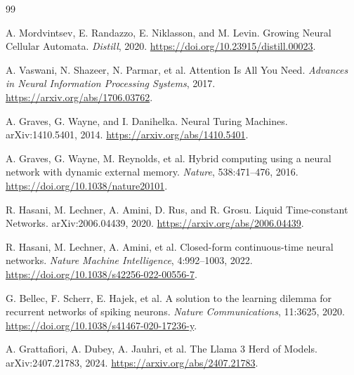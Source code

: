 \documentclass[11pt]{article}
\begin{document}
\begin{thebibliography}{99}

A. Mordvintsev, E. Randazzo, E. Niklasson, and M. Levin.
\newblock Growing Neural Cellular Automata.
\newblock \emph{Distill}, 2020.
\newblock \url{https://doi.org/10.23915/distill.00023}.

A. Vaswani, N. Shazeer, N. Parmar, et al.
\newblock Attention Is All You Need.
\newblock \emph{Advances in Neural Information Processing Systems}, 2017.
\newblock \url{https://arxiv.org/abs/1706.03762}.

A. Graves, G. Wayne, and I. Danihelka.
\newblock Neural Turing Machines.
\newblock arXiv:1410.5401, 2014.
\newblock \url{https://arxiv.org/abs/1410.5401}.

A. Graves, G. Wayne, M. Reynolds, et al.
\newblock Hybrid computing using a neural network with dynamic external memory.
\newblock \emph{Nature}, 538:471--476, 2016.
\newblock \url{https://doi.org/10.1038/nature20101}.

R. Hasani, M. Lechner, A. Amini, D. Rus, and R. Grosu.
\newblock Liquid Time-constant Networks.
\newblock arXiv:2006.04439, 2020.
\newblock \url{https://arxiv.org/abs/2006.04439}.

R. Hasani, M. Lechner, A. Amini, et al.
\newblock Closed-form continuous-time neural networks.
\newblock \emph{Nature Machine Intelligence}, 4:992--1003, 2022.
\newblock \url{https://doi.org/10.1038/s42256-022-00556-7}.

G. Bellec, F. Scherr, E. Hajek, et al.
\newblock A solution to the learning dilemma for recurrent networks of spiking neurons.
\newblock \emph{Nature Communications}, 11:3625, 2020.
\newblock \url{https://doi.org/10.1038/s41467-020-17236-y}.

A. Grattafiori, A. Dubey, A. Jauhri, et al.
\newblock The Llama 3 Herd of Models.
\newblock arXiv:2407.21783, 2024.
\newblock \url{https://arxiv.org/abs/2407.21783}.

\end{thebibliography}
\end{document}
